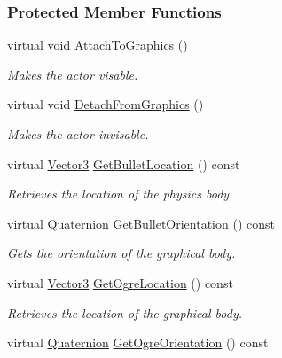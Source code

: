 \subsubsection*{Protected Member Functions}
\begin{DoxyCompactItemize}
\item 
virtual void \hyperlink{classphys_1_1ActorBase_a45f190cb9b647bb3385d1298f9dab589}{AttachToGraphics} ()
\begin{DoxyCompactList}\small\item\em Makes the actor visable. \item\end{DoxyCompactList}\item 
virtual void \hyperlink{classphys_1_1ActorBase_acc352d14b6d7f15694ea108ec1c281ec}{DetachFromGraphics} ()
\begin{DoxyCompactList}\small\item\em Makes the actor invisable. \item\end{DoxyCompactList}\item 
virtual \hyperlink{classphys_1_1Vector3}{Vector3} \hyperlink{classphys_1_1ActorBase_a9b32df1efdc346f5d6c0920b959c09a3}{GetBulletLocation} () const 
\begin{DoxyCompactList}\small\item\em Retrieves the location of the physics body. \item\end{DoxyCompactList}\item 
virtual \hyperlink{classphys_1_1Quaternion}{Quaternion} \hyperlink{classphys_1_1ActorBase_ab34e885196b165229b6e328137eea4e4}{GetBulletOrientation} () const 
\begin{DoxyCompactList}\small\item\em Gets the orientation of the graphical body. \item\end{DoxyCompactList}\item 
virtual \hyperlink{classphys_1_1Vector3}{Vector3} \hyperlink{classphys_1_1ActorBase_a12ef0a2625e2fdf506ea8e23e0a378fa}{GetOgreLocation} () const 
\begin{DoxyCompactList}\small\item\em Retrieves the location of the graphical body. \item\end{DoxyCompactList}\item 
virtual \hyperlink{classphys_1_1Quaternion}{Quaternion} \hyperlink{classphys_1_1ActorBase_a70ca5364c59d7246146f9b7fce811d7f}{GetOgreOrientation} () const 

\end{DoxyCompactItemize}
